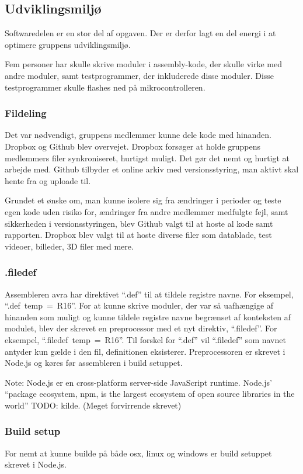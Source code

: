 \subsection{Udviklingsmiljø}

Softwaredelen er en stor del af opgaven. Der er derfor lagt en del energi i at optimere gruppens udviklingsmiljø.

Fem personer har skulle skrive moduler i assembly-kode, der skulle virke med andre moduler, samt testprogrammer, der inkluderede disse moduler. Disse testprogrammer skulle flashes ned på mikrocontrolleren.

\subsubsection{Fildeling}
Det var nødvendigt, gruppens medlemmer kunne dele kode med hinanden. Dropbox og Github blev overvejet.
Dropbox forsøger at holde gruppens medlemmers filer synkroniseret, hurtigst muligt.
Det gør det nemt og hurtigt at arbejde med.
Github tilbyder et online arkiv med versionsstyring, man aktivt skal hente fra og uploade til.

Grundet et ønske om, man kunne isolere sig fra ændringer i perioder og teste egen kode uden risiko for, ændringer fra andre medlemmer medfulgte fejl, samt sikkerheden i versionsstyringen, blev Github valgt til at hoste al kode samt rapporten.
Dropbox blev valgt til at hoste diverse filer som datablade, test videoer, billeder, 3D filer med mere.

\subsubsection{.filedef}
Assembleren avra har direktivet \mbox{``.def''} til at tildele registre navne. For eksempel, \mbox{``.def temp = R16''}.
For at kunne skrive moduler, der var så uafhængige af hinanden som muligt og kunne tildele registre navne begrænset af konteksten af modulet, blev der skrevet en preprocessor med et nyt direktiv, \mbox{``.filedef''}. For eksempel, \mbox{``.filedef temp = R16''}. Til forskel for \mbox{``.def''} vil \mbox{``.filedef''} som navnet antyder kun gælde i den fil, definitionen eksisterer. Preprocessoren er skrevet i Node.js og køres før assembleren i build setuppet.

\begin{mdquote}
	Note: Node.js er en cross-platform server-side JavaScript runtime. Node.js' ``package ecosystem, npm, is the largest ecosystem of open source libraries in the world'' TODO: kilde. (Meget forvirrende skrevet)
\end{mdquote}

\subsubsection{Build setup}
For nemt at kunne builde på både osx, linux og windows er build setuppet skrevet i Node.js.
